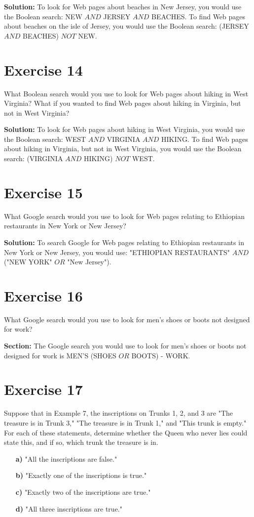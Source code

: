 \documentclass{Axon}
\begin{document}
\noindent
\textbf{Solution:}
To look for Web pages about beaches in New Jersey, you would use the Boolean search: NEW \(AND\) JERSEY \(AND\) BEACHES. To find Web pages about beaches on the isle of Jersey, you would use the Boolean search: (JERSEY \(AND\) BEACHES) \(NOT\) NEW.

\section*{Exercise 14}
What Boolean search would you use to look for Web pages about hiking in West Virginia? What if you wanted to find Web pages about hiking in Virginia, but not in West Virginia?

\noindent
\textbf{Solution:}
To look for Web pages about hiking in West Virginia, you would use the Boolean search: WEST \(AND\) VIRGINIA \(AND\) HIKING. To find Web pages about hiking in Virginia, but not in West Virginia, you would use the Boolean search: (VIRGINIA \(AND\) HIKING) \(NOT\) WEST.

\section*{Exercise 15}
What Google search would you use to look for Web pages relating to Ethiopian restaurants in New York or New Jersey?

\noindent
\textbf{Solution:}
To search Google for Web pages relating to Ethiopian restaurants in New York or New Jersey, you would use: "ETHIOPIAN RESTAURANTS" \(AND\) ("NEW YORK" \(OR\) "New Jersey").

\section*{Exercise 16}
What Google search would you use to look for men's shoes or boots not designed for work?

\noindent
\textbf{Section:}
The Google search you would use to look for men's shoes or boots not designed for work is MEN'S (SHOES \(OR\) BOOTS) - WORK.

\section*{Exercise 17}
Suppose that in Example 7, the inscriptions on Trunks 1, 2, and 3 are "The treasure is in Trunk 3," "The treasure is in Trunk 1," and "This trunk is empty." For each of these statements, determine whether the Queen who never lies could state this, and if so, which trunk the treasure is in.
\begin{enumerate}
    \item[\textbf{a)}] "All the inscriptions are false."
    \item[\textbf{b)}] "Exactly one of the inscriptions is true."
    \item[\textbf{c)}] "Exactly two of the inscriptions are true."
    \item[\textbf{d)}] "All three inscriptions are true."
\end{enumerate}
\end{document}
